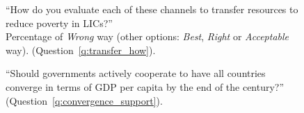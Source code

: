 \begin{figure}[h!]
    \caption[\textit{Wrong} way to transfer resources to LICs]{``How do you evaluate each of these channels to transfer resources to reduce poverty in LICs?''\\ Percentage of \textit{Wrong} way (other options: \textit{Best}, \textit{Right} or \textit{Acceptable} way). (Question~\ref{q:transfer_how}).
    }\label{fig:transfer_how_negative}
\end{figure}

\begin{figure}[h!]
    \caption[Support for making all countries' GDP p.c. converge by 2100]{``Should governments actively cooperate to have all countries converge in terms of GDP per capita by the end of the century?'' (Question~\ref{q:convergence_support}).
    }\label{fig:convergence_support}
\end{figure}

